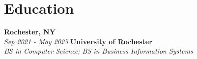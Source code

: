 \section{Education}

\begin{twocolentry}{
    \textbf{Rochester, NY} \\
    \textit{Sep 2021 - May 2025}
}{
    \textbf{University of Rochester} \\
    \textit{BS in Computer Science; BS in Business Information Systems}
}
\end{twocolentry}

